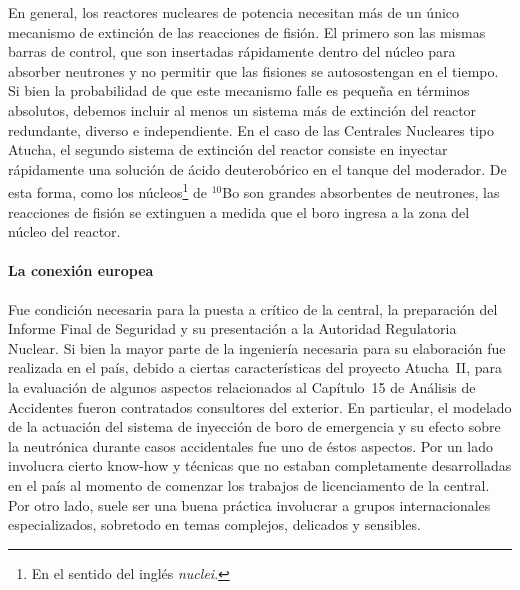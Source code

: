 En general, los reactores nucleares de potencia necesitan más de un único mecanismo de extinción de las reacciones de fisión. El primero son las mismas barras de control, que son insertadas rápidamente dentro del núcleo para absorber neutrones y no permitir que las fisiones se autosostengan en el tiempo. Si bien la probabilidad de que este mecanismo falle es pequeña en términos absolutos, debemos incluir al menos un sistema más de extinción del reactor redundante, diverso e independiente. En el caso de las Centrales Nucleares tipo Atucha, el segundo sistema de extinción del reactor consiste en inyectar rápidamente una solución de ácido deuterobórico en el tanque del moderador. De esta forma, como los núcleos\footnote{En el sentido del inglés \emph{nuclei}.} de $^{10}$Bo son grandes absorbentes de neutrones, las reacciones de fisión se extinguen a medida que el boro ingresa a la zona del núcleo del reactor.

\paragraph{La conexión europea}
Fue condición necesaria para la puesta a crítico de la central, la preparación del Informe Final de Seguridad y su presentación a la Autoridad Regulatoria Nuclear. Si bien la mayor parte de la ingeniería necesaria para su elaboración fue realizada en el país, debido a ciertas características del proyecto Atucha~II, para la evaluación de algunos aspectos relacionados al Capítulo~15 de Análisis de Accidentes fueron contratados consultores del exterior. En particular, el modelado de la actuación del sistema de inyección de boro de emergencia y su efecto sobre la neutrónica durante casos accidentales fue uno de éstos aspectos. Por un lado involucra cierto know-how y técnicas que no estaban completamente desarrolladas en el país al momento de comenzar los trabajos de licenciamento de la central. Por otro lado, suele ser una buena práctica involucrar a grupos internacionales especializados, sobretodo en temas complejos, delicados y sensibles.

